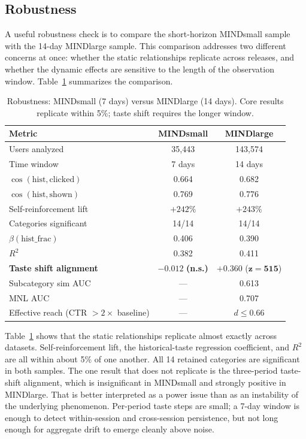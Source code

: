 \documentclass[11pt]{article}
\begin{document}
\subsection{Robustness}

A useful robustness check is to compare the short-horizon MINDsmall sample with the 14-day MINDlarge sample. This comparison addresses two different concerns at once: whether the static relationships replicate across releases, and whether the dynamic effects are sensitive to the length of the observation window. Table~\ref{tab:robustness} summarizes the comparison.

\begin{table}[ht]
\centering
\caption{Robustness: MINDsmall (7 days) versus MINDlarge (14 days). Core results replicate within 5\%; taste shift requires the longer window.}
\label{tab:robustness}
\begin{tabular}{lcc}
\toprule
Metric & MINDsmall & MINDlarge \\
\midrule
Users analyzed & 35,443 & 143,574 \\
Time window & 7 days & 14 days \\
$\cos(\text{hist}, \text{clicked})$ & 0.664 & 0.682 \\
$\cos(\text{hist}, \text{shown})$ & 0.769 & 0.776 \\
Self-reinforcement lift & $+242\%$ & $+243\%$ \\
Categories significant & 14/14 & 14/14 \\
$\beta(\text{hist\_frac})$ & 0.406 & 0.390 \\
$R^2$ & 0.382 & 0.411 \\
\textbf{Taste shift alignment} & $\boldsymbol{-0.012}$ \textbf{(n.s.)} & $\boldsymbol{+0.360}$ ($\boldsymbol{z = 515}$) \\
Subcategory sim AUC & --- & 0.613 \\
MNL AUC & --- & 0.707 \\
Effective reach (CTR $> 2\times$ baseline) & --- & $d \leq 0.66$ \\
\bottomrule
\end{tabular}
\end{table}
\FloatBarrier

Table~\ref{tab:robustness} shows that the static relationships replicate almost exactly across datasets. Self-reinforcement lift, the historical-taste regression coefficient, and $R^2$ are all within about 5\% of one another. All 14 retained categories are significant in both samples. The one result that does not replicate is the three-period taste-shift alignment, which is insignificant in MINDsmall and strongly positive in MINDlarge. That is better interpreted as a power issue than as an instability of the underlying phenomenon. Per-period taste steps are small; a 7-day window is enough to detect within-session and cross-session persistence, but not long enough for aggregate drift to emerge cleanly above noise.
\end{document}
